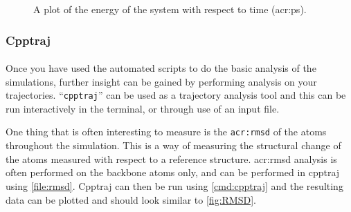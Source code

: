     \begin{figure}[H]
        \centering
        \caption{A plot of the energy of the system with respect to time (\gls{acr:ps}).}
        \label{fig:En}
    \end{figure}

    \subsubsection{Cpptraj}
    \paragraph{}
        Once you have used the automated scripts to do the basic analysis of the simulations, further insight can be gained by performing analysis on your trajectories. \enquote{\texttt{cpptraj}} can be used as a trajectory analysis tool and this can be run interactively in the terminal, or through use of an input file. 

        One thing that is often interesting to measure is the \texttt{\gls{acr:rmsd}} of the atoms throughout the simulation. This is a way of measuring the structural change of the atoms measured with respect to a reference structure. \gls{acr:rmsd} analysis is often performed on the backbone atoms only, and can be performed in cpptraj using \cref{file:rmsd}. Cpptraj can then be run using \cref{cmd:cpptraj} and the resulting data can be plotted and should look similar to \cref{fig:RMSD}.

